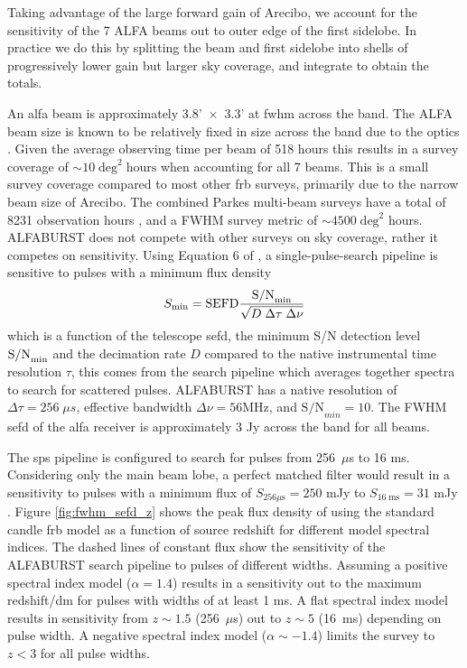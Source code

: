 \documentclass[a4paper,fleqn,usenatbib]{mnras}
\begin{document}
Taking advantage of the large forward gain of Arecibo, we account for
the sensitivity of the 7 ALFA beams out to outer edge of the first
sidelobe. In practice we do this by splitting the beam and first
sidelobe into shells of progressively lower gain but larger sky
coverage, and integrate to obtain the totals.

An \gls{alfa} beam is approximately 3.8'~$\times$~3.3' at \gls{fwhm} across the
band.  The ALFA beam size is known to be relatively fixed in size across the
band due to the optics \citep{GALFAbeam}.  Given the average observing time per
beam of 518 hours this results in a survey coverage of $\sim 10 \;
\textrm{deg}^2 \; \textrm{hours}$ when accounting for all 7 beams. This is a
small survey coverage compared to most other \gls{frb} surveys, primarily due to
the narrow beam size of Arecibo. The combined Parkes multi-beam surveys have a
total of 8231 observation hours \citep{2016MNRAS.460.3370C}, and a FWHM survey
metric of $\sim 4500 \; \textrm{deg}^2$ hours.  ALFABURST does not compete with
other surveys on sky coverage, rather it competes on sensitivity.  Using
Equation 6 of \cite{2015MNRAS.452.1254K}, a  single-pulse-search pipeline is
sensitive to pulses with a minimum flux density
%
\begin{equation}
S_{\rm min} = \textrm{SEFD} \frac{\textrm{S/N}_{\rm min}}{\sqrt{D \; \Delta \tau \;
\Delta \nu}}
\end{equation}
%
which is a function of the telescope \gls{sefd}, the minimum S/N
detection level $\textrm{S/N}_{\rm min}$ and the decimation rate $D$
compared to the native instrumental time resolution $\tau$, this comes
from the search pipeline which averages together spectra to search for
scattered pulses. ALFABURST has a native resolution of $\Delta \tau =
256 \; \mu s$, effective bandwidth $\Delta \nu = 56 \textrm{MHz}$, and
$\textrm{S/N}_{min} = 10$. The FWHM \gls{sefd} of the \gls{alfa}
receiver is approximately 3 Jy across the band for all beams.

The \gls{sps} pipeline is configured to search for pulses from 256~$\mu$s to 16
ms. Considering only the main beam lobe, a perfect matched filter would result
in a sensitivity to pulses with a minimum flux of $S_{256 \mu\textrm{s}} = 250$
mJy to $S_{16 \; \textrm{ms}} = 31$ mJy \citep{2015MNRAS.452.1254K}. Figure
\ref{fig:fwhm_sefd_z} shows the peak flux density of using the standard candle
\gls{frb} model as a function of source redshift for different model spectral
indices. The dashed lines of constant flux show the sensitivity of the ALFABURST
search pipeline to pulses of different widths. Assuming a positive spectral
index model ($\alpha=1.4$) results in a sensitivity out to the maximum
redshift/\gls{dm} for pulses with widths of at least 1 ms. A flat spectral index
model results in sensitivity from $z \sim 1.5$ (256~$\mu$s) out to $z \sim 5$
(16~ms) depending on pulse width. A negative spectral index model ($\alpha \sim
-1.4$) limits the survey to $z < 3$ for all pulse widths.
\end{document}
